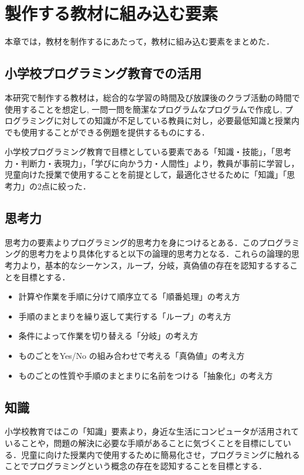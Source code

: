 \newpage

\section{\rm 製作する教材に組み込む要素}
本章では，教材を制作するにあたって，教材に組み込む要素をまとめた．

\subsection{小学校プログラミング教育での活用}
本研究で制作する教材は，総合的な学習の時間及び放課後のクラブ活動の時間で使用することを想定し, 一問一問を簡潔なプログラムなプログラムで作成し, プログラミングに対しての知識が不足している教員に対し，必要最低知識と授業内でも使用することができる例題を提供するものにする．

小学校プログラミング教育で目標としている要素である「知識・技能」，「思考力・判断力・表現力」，「学びに向かう力・人間性」より，教員が事前に学習し， 児童向けた授業で使用することを前提として，最適化させるために「知識」「思考力」の2点に絞った．

\subsection{思考力}
思考力の要素よりプログラミング的思考力を身につけるとある．このプログラミング的思考力をより具体化すると以下の論理的思考力となる．これらの論理的思考力より，基本的なシーケンス，ループ，分岐，真偽値の存在を認知するすることを目標とする．
\begin{itemize}
\item 計算や作業を手順に分けて順序立てる「順番処理」の考え方\\
\item 手順のまとまりを繰り返して実行する「ループ」の考え方\\
\item 条件によって作業を切り替える「分岐」の考え方\\
\item ものごとをYes/No の組み合わせで考える「真偽値」の考え方\\
\item ものごとの性質や手順のまとまりに名前をつける「抽象化」の考え方
\end{itemize}

\subsection{知識}
小学校教育ではこの「知識」要素より，身近な生活にコンピュータが活用されていることや，問題の解決に必要な手順があることに気づくことを目標にしている．児童に向けた授業内で使用するために簡易化させ，プログラミングに触れることでプログラミングという概念の存在を認知することを目標とする．

